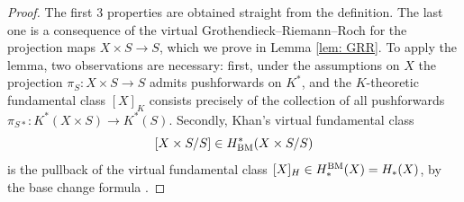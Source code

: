 \documentclass[12pt]{amsart}
\theoremstyle{definition}
\newcommand{\1}{\mathbf 1}
\begin{document}
\begin{proof}
    The first 3 properties are obtained straight from the definition. The last one is a consequence of the virtual Grothendieck--Riemann--Roch for the projection maps $X\times S\to S$, which we prove in Lemma \ref{lem: GRR}. 
    To apply the lemma, two observations are necessary: first, under the assumptions on $X$ the projection $\pi_S\colon X\times S\to S$ admits pushforwards on $K^\ast$, and the $K$-theoretic fundamental class $[X]_K$ consists precisely of the collection of all pushforwards $\pi_{S\ast}\colon K^\ast(X\times S)\to K^\ast(S)$. Secondly, Khan's virtual fundamental class 
    \[[X\times S/S]\in H^\ast_{\textup{BM}}(X\times S/S)\]
    is the pullback of the virtual fundamental class $[X]_H\in H_\ast^{\textup{BM}}(X)=H_\ast(X)$, by the base change formula \cite[Theorem 3.13]{khanVFC}.\qedhere
\end{proof}
\end{document}
